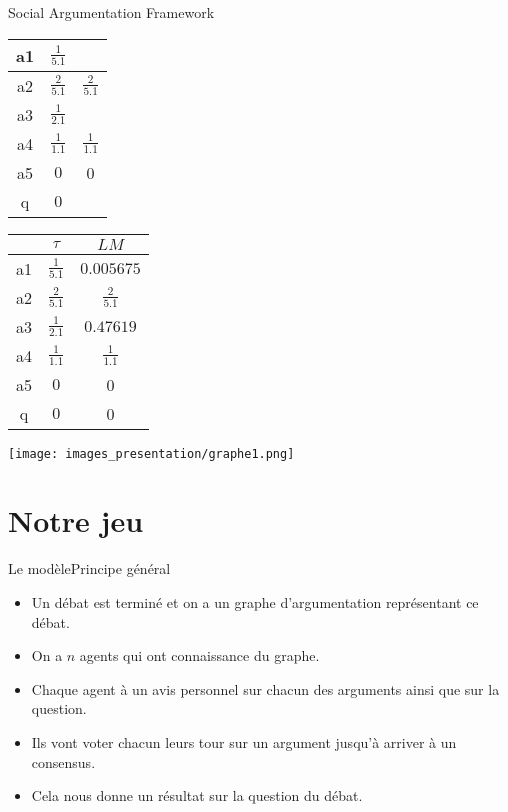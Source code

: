 \documentclass{beamer}
\begin{document}
\begin{frame}{Social Argumentation Framework}
\begin{minipage}[c]{.6\linewidth}
\begin{overprint}
\begin{tabular}{|c|c|c|}
          \hline
          a1 & $\frac{1}{5.1}$ & \\
          \hline
          a2 & $\frac{2}{5.1}$ & $\frac{2}{5.1}$ \\
          \hline
          a3 & $\frac{1}{2.1}$ & \\
          \hline
          a4 & $\frac{1}{1.1}$ & $\frac{1}{1.1}$\\
          \hline
          a5 & $0$ & 0\\
          \hline
          q & $0$ & \\
          \hline
        \end{tabular}
        \begin{tabular}{|c|c|c|}
          \hline
          & $\tau$ & $LM$\\
          \hline
          a1 & $\frac{1}{5.1}$ & $0.005675$\\
          \hline
          a2 & $\frac{2}{5.1}$ & $\frac{2}{5.1}$ \\
          \hline
          a3 & $\frac{1}{2.1}$ & $0.47619$\\
          \hline
          a4 & $\frac{1}{1.1}$ & $\frac{1}{1.1}$\\
          \hline
          a5 & $0$ & 0\\
          \hline
          q & $0$ & 0\\
          \hline
        \end{tabular}
      \end{overprint}

    \end{minipage}\hfill
    \begin{minipage}[c]{.35\linewidth}
    \texttt{[image: images\_presentation/graphe1.png]}
  \end{minipage}
    \end{frame}

    \section{Notre jeu}
  \begin{frame}{Le modèle}{Principe général}
    \begin{itemize}
      \item Un débat est terminé et on a un graphe d'argumentation représentant ce débat.
      \item On a $n$ agents qui ont connaissance du graphe.
      \item Chaque agent à un avis personnel sur chacun des arguments ainsi que sur la question.
      \item Ils vont voter chacun leurs tour sur un argument jusqu'à arriver à un consensus.
      \item Cela nous donne un résultat sur la question du débat.
    \end{itemize}
  \end{frame}
\end{document}
